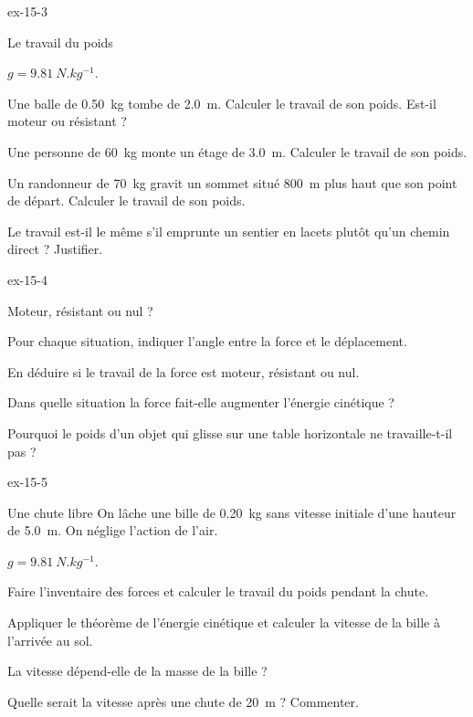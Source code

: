 \begin{blocLivre}{ex-15-3}
\begin{exercice}[1]{Le travail du poids}
\begin{donnees}
$g=\qty{9,81}{N.kg^{-1}}$.
\end{donnees}
\begin{questions}
\item Une balle de \qty{0,50}{kg} tombe de \qty{2,0}{m}. Calculer le travail de son poids. Est-il moteur ou résistant ?
\item Une personne de \qty{60}{kg} monte un étage de \qty{3,0}{m}. Calculer le travail de son poids.
\item Un randonneur de \qty{70}{kg} gravit un sommet situé \qty{800}{m} plus haut que son point de départ. Calculer le travail de son poids.
\item Le travail est-il le même s'il emprunte un sentier en lacets plutôt qu'un chemin direct ? Justifier.
\end{questions}
\end{exercice}
\end{blocLivre}
\begin{blocLivre}{ex-15-4}
\begin{exercice}[1]{Moteur, résistant ou nul ?}
\begin{questions}
\item Pour chaque situation, indiquer l'angle entre la force et le déplacement.
\item En déduire si le travail de la force est moteur, résistant ou nul.
\item Dans quelle situation la force fait-elle augmenter l'énergie cinétique ?
\item Pourquoi le poids d'un objet qui glisse sur une table horizontale ne travaille-t-il pas ?
\end{questions}
\end{exercice}
\end{blocLivre}
\begin{blocLivre}{ex-15-5}
\begin{exercice}[1]{Une chute libre}
On lâche une bille de \qty{0,20}{kg} sans vitesse initiale d'une hauteur de \qty{5,0}{m}. On néglige l'action de l'air.
\begin{donnees}
$g=\qty{9,81}{N.kg^{-1}}$.
\end{donnees}
\begin{questions}
\item Faire l'inventaire des forces et calculer le travail du poids pendant la chute.
\item Appliquer le théorème de l'énergie cinétique et calculer la vitesse de la bille à l'arrivée au sol.
\item La vitesse dépend-elle de la masse de la bille ?
\item Quelle serait la vitesse après une chute de \qty{20}{m} ? Commenter.
\end{questions}
\end{exercice}
\end{blocLivre}
